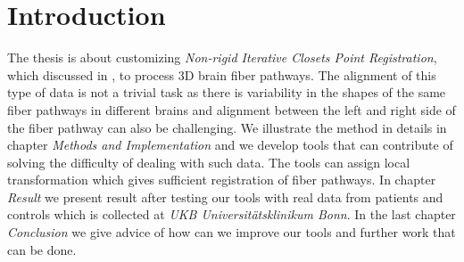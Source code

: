 \documentclass[../structure.tex]{subfiles}
\begin{document}
\chapter{Introduction}

The thesis is about customizing \textit{Non-rigid Iterative Closets Point Registration}, which discussed in \cite{Amberg2007}, to process 3D brain fiber pathways. The alignment of this type of data is not a trivial task as there is variability  in the shapes of the same fiber pathways in different brains and alignment between the left and right side of the fiber pathway can also be challenging. We illustrate the method in details in chapter \textit{Methods and Implementation} and we develop tools that can contribute of solving the difficulty of dealing with such data. The tools can assign local transformation which gives sufficient registration of fiber pathways. In chapter \textit{Result} we present result after testing our tools with real data from patients and controls which is collected at \textit{UKB Universitätsklinikum Bonn}. In the last chapter \textit{Conclusion} we give advice of how can we improve our tools and further work that can be done.
\end{document}
